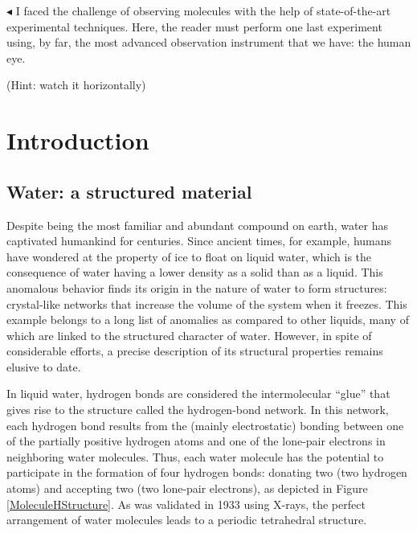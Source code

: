 
\begin{savequote}[75mm]
$\blacktriangleleft$ I faced the challenge of observing molecules with the help of state-of-the-art experimental techniques. Here, the reader must perform one last experiment using, by far, the most advanced observation instrument that we have: the human eye.

\vspace{3pt}

(Hint: watch it horizontally)
\end{savequote}


\chapter{Introduction}\label{chap:introduction}


\vspace{30pt}


\section{Water: a structured material}


Despite being the most familiar and abundant compound on earth, water has captivated humankind for centuries. Since ancient times, for example, humans have wondered at the property of ice to float on liquid water, which is the consequence of water having a lower density as a solid than as a liquid. This anomalous behavior finds its origin in the nature of water to form structures: crystal-like networks that increase the volume of the system when it freezes. This example belongs to a long list of anomalies as compared to other liquids,\!\cite{Russo2018} many of which are linked to the structured character of water. However, in spite of considerable efforts, a precise description of its structural properties remains elusive to date.\!\cite{Ball2008}




In liquid water, hydrogen bonds are considered the intermolecular ``glue'' that gives rise to the structure called the hydrogen-bond network. In this network, each hydrogen bond results from the (mainly electrostatic) bonding between one of the partially positive hydrogen atoms and one of the lone-pair electrons in neighboring water molecules. Thus, each water molecule has the potential to participate in the formation of four hydrogen bonds: donating two (two hydrogen atoms) and accepting two (two lone-pair electrons), as depicted in Figure \ref{MoleculeHStructure}. As was validated in 1933 using X-rays, the perfect arrangement of water molecules leads to a periodic tetrahedral structure.\!\cite{Bernal1933}




